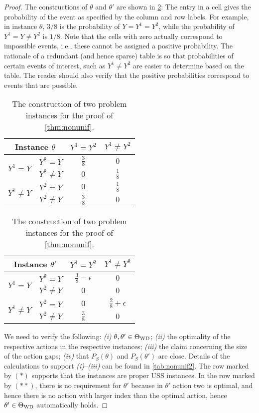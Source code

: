 \begin{proof}
The constructions of $\theta$ and $\theta'$ are shown in \cref{tab:nonunif}:
The entry in a cell gives the probability of the event as specified by the column and row labels.
For example, in instance $\theta$, $3/8$ is the probability of $Y=Y^1=Y^2$, 
while the probability of $Y^1=Y\ne Y^2$ is $1/8$. Note that the cells with zero actually 
correspond to impossible events, i.e., these cannot be assigned a positive probability.
The rationale of a redundant (and hence sparse) table is so that probabilities of certain events of interest, such as $Y^1\ne Y^2$ are easier to determine based on the table. The reader should also verify that the positive probabilities correspond to events that are possible.
\bgroup
\def\arraystretch{1.5}
\begin{table}[]
	\centering
	\begin{tabular}{|c|c|c|c|}
		\hline
		\multicolumn{2}{|c|}{Instance $\theta$}  & $Y^1=Y^2$     & $Y^1\ne Y^2$  \\ \hline
		\multirow{2}{*}{$Y^1= Y$}   & $Y^2= Y$   & $\frac{3}{8}$ & $0$           \\ \cline{2-4} 
		& $Y^2\ne Y$ & $0$ & $\frac{1}{8}$ \\ \hline
		\multirow{2}{*}{$Y^1\ne Y$} & $Y^2= Y$   & $0$ & $\frac{1}{8}$           \\ \cline{2-4} 
		& $Y^2\ne Y$ & $\frac{3}{8}$ & $0$ \\ \hline
	\end{tabular}
	\hspace*{0.5in}
	\begin{tabular}{|c|c|c|c|}
		\hline
		\multicolumn{2}{|c|}{Instance $\theta'$}  & $Y^1=Y^2$     & $Y^1\ne Y^2$  \\ \hline
		\multirow{2}{*}{$Y^1= Y$}   & $Y^2= Y$   & $\frac{3}{8}-\epsilon$ & $0$           \\ \cline{2-4} 
		& $Y^2\ne Y$ & $0$ & $0$ \\ \hline
		\multirow{2}{*}{$Y^1\ne Y$} & $Y^2= Y$   & $0$ & $\frac{2}{8}+\epsilon$           \\ \cline{2-4} 
		& $Y^2\ne Y$ & $\frac{3}{8}$ & $0$ \\ \hline
	\end{tabular}
	\vspace*{0.1in}
	\caption{The construction of two problem instances for the proof of \cref{thm:nonunif}.}
	\label{tab:nonunif}
\end{table}
\egroup

We need to verify the following:
{\em (i)} $\theta,\theta'\in \Theta_{\mathrm{WD}}$;
{\em (ii)} the optimality of the respective actions in the respective instances;
{\em (iii)} the claim concerning the size of the action gaps;
{\em (iv)} that $P_S(\theta)$ and $P_S(\theta')$ are close.
Details of the calculations to support {\em (i)}--{\em (iii)} can be found in \cref{tab:nonunif2}.
The row marked by $(*)$ supports that the instances are proper USS instances.
In the row marked by $(**)$, there is no requirement for $\theta'$ because 
in $\theta'$ action two is optimal, and hence there is no action with larger index 
than the optimal action, hence $\theta'\in \Theta_{\mathrm{WD}}$ automatically holds.


\end{proof}
